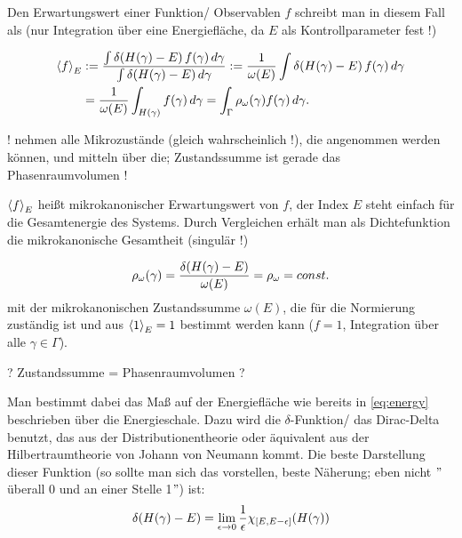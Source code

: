 Den Erwartungswert einer Funktion/ Observablen $f$ schreibt man in diesem Fall als (nur Integration über eine Energiefläche, da $E$ als Kontrollparameter fest !)

\begin{align}\label{eq:microzust}
\expval{f}_E &:= %
\frac{\int \delta\qty(H(\gamma) - E) \, f(\gamma) \, d\gamma}{\int \delta\qty(H(\gamma) - E) \, d\gamma} := \frac{1}{\omega(E)} \int \delta\qty(H(\gamma) - E) \, f(\gamma) \, d\gamma
\\
&= \frac{1}{\omega(E)} \int_{H(\gamma)} f(\gamma) \, d\gamma = \int_\Gamma \rho_\omega(\gamma) f(\gamma) \, d\gamma \notag .
\end{align}

! nehmen alle Mikrozustände (gleich wahrscheinlich !), die angenommen werden können, und mitteln über die; Zustandssumme ist gerade das Phasenraumvolumen !

$\expval{f}_E$ heißt mikrokanonischer Erwartungswert von $f$, der Index $E$ steht einfach für die Gesamtenergie des Systems. Durch Vergleichen erhält man als Dichtefunktion die mikrokanonische Gesamtheit (singulär !)

\begin{equation}\label{eq:dichtef}
\rho_\omega(\gamma) = \frac{\delta\qty(H\qty(\gamma) - E)}{\omega(E)} = \rho_\omega = const.
\end{equation}
mit der mikrokanonischen Zustandssumme $\omega(E)$, die für die Normierung zuständig ist und aus $\expval{1}_E = 1$ bestimmt werden kann ($f = 1$, Integration über alle $\gamma \in \Gamma$).


? Zustandssumme = Phasenraumvolumen ?


Man bestimmt dabei das Maß auf der Energiefläche wie bereits in \eqref{eq:energy} beschrieben über die Energieschale. Dazu wird die $\delta$-Funktion/ das Dirac-Delta benutzt, das aus der Distributionentheorie oder äquivalent aus der Hilbertraumtheorie von Johann von Neumann kommt. Die beste Darstellung dieser Funktion (so sollte man sich das vorstellen, beste Näherung; eben nicht $"$überall 0 und an einer Stelle 1$"$) ist:
\begin{equation}
\delta\qty(H(\gamma) - E) = \lim_{\epsilon \rightarrow 0} \frac{1}{\epsilon} \chi_{[E, E-\epsilon]}\qty(H(\gamma))
\end{equation}

